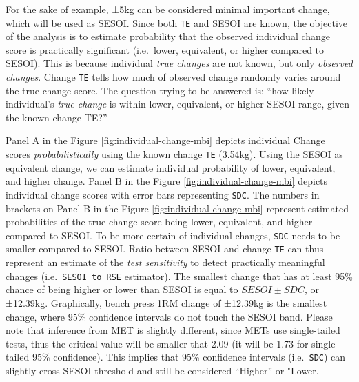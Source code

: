 \documentclass[
]{book}
\begin{document}
For the sake of example, ±5kg can be considered minimal important change, which will be used as SESOI. Since both \texttt{TE} and SESOI are known, the objective of the analysis is to estimate probability that the observed individual change score is practically significant (i.e.~lower, equivalent, or higher compared to SESOI). This is because individual \emph{true changes} are not known, but only \emph{observed changes}. Change \texttt{TE} tells how much of observed change randomly varies around the true change score. The question trying to be answered is: ``how likely individual's \emph{true change} is within lower, equivalent, or higher SESOI range, given the known change TE?''

Panel A in the Figure \ref{fig:individual-change-mbi} depicts individual Change scores \emph{probabilistically} using the known change \texttt{TE} (3.54kg). Using the SESOI as equivalent change, we can estimate individual probability of lower, equivalent, and higher change. Panel B in the Figure \ref{fig:individual-change-mbi} depicts individual change scores with error bars representing \texttt{SDC}. The numbers in brackets on Panel B in the Figure \ref{fig:individual-change-mbi} represent estimated probabilities of the true change score being lower, equivalent, and higher compared to SESOI. To be more certain of individual changes, \texttt{SDC} needs to be smaller compared to SESOI. Ratio between SESOI and change \texttt{TE} can thus represent an estimate of the \emph{test sensitivity} to detect practically meaningful changes (i.e.~\texttt{SESOI\ to\ RSE} estimator). The smallest change that has at least 95\% chance of being higher or lower than SESOI is equal to \(SESOI \pm SDC\), or ±12.39kg. Graphically, bench press 1RM change of ±12.39kg is the smallest change, where 95\% confidence intervals do not touch the SESOI band. Please note that inference from MET is slightly different, since METs use single-tailed tests, thus the critical value will be smaller that 2.09 (it will be 1.73 for single-tailed 95\% confidence). This implies that 95\% confidence intervals (i.e.~\texttt{SDC}) can slightly cross SESOI threshold and still be considered ``Higher'' or "Lower.
\end{document}
